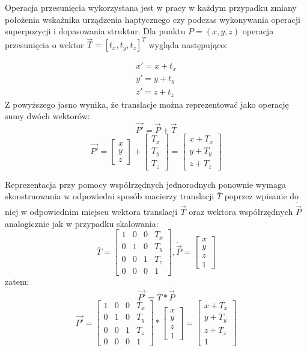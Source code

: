\documentclass[licencjacka]{pracamgr}
\begin{document}
Operacja przesunięcia wykorzystana jest w pracy w każdym przypadku zmiany położenia wskaźnika urządzenia haptycznego czy podczas wykonywania operacji superpozycji i dopasowania struktur. Dla punktu $P=(x,y,z)$ operacja przesunięcia o wektor $\vec{T}=[t_x, t_y, t_z]^T$ wygląda następująco:

$$
\begin{array}{lr}
x'=x+t_x \\
y'=y+t_y \\
z'=z+t_z
\end{array}
$$
Z powyższego jasno wynika, że translacje można reprezentować jako operację sumy dwóch wektorów:
$$
\vec{P'}=\vec{P}+\vec{T}
$$
$$
\vec{P'}
=
\begin{bmatrix}
x \\
y \\
z
\end{bmatrix}
+
\begin{bmatrix}
T_x \\
T_y \\
T_z 
\end{bmatrix}
=
\begin{bmatrix}
x+T_x \\
y+T_y \\
z+T_z 
\end{bmatrix}
$$

Reprezentacja przy pomocy współrzędnych jednorodnych ponownie wymaga skonstruowania w odpowiedni sposób macierzy translacji $\bar{T}$ poprzez wpisanie do niej w odpowiednim miejscu wektora translacji $\vec{T}$ oraz wektora współrzędnych $\dot{\vec{P}}$ analogicznie jak w przypadku skalowania:
$$
\bar{T}
=
\begin{bmatrix}
1 & 0 & 0 & T_x \\
0 & 1 & 0 & T_y \\
0 & 0 & 1 & T_z \\
0 & 0 & 0 & 1
\end{bmatrix}
,
\dot{\vec{P}}
=
\begin{bmatrix}
x \\
y \\
z \\
1
\end{bmatrix}
$$
zatem:
$$
\vec{P'}=\bar{T}*\dot{\vec{P}}
$$
$$
\vec{P'}=
\begin{bmatrix}
1 & 0 & 0 & T_x \\
0 & 1 & 0 & T_y \\
0 & 0 & 1 & T_z \\
0 & 0 & 0 & 1
\end{bmatrix}
*
\begin{bmatrix}
x \\
y \\
z \\
1
\end{bmatrix}
=
\begin{bmatrix}
x+T_x \\
y+T_y \\
z+T_z \\
1
\end{bmatrix}
$$
\end{document}
